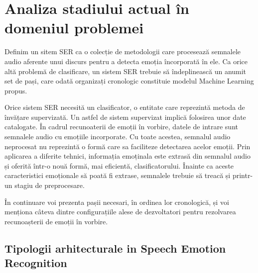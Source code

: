 \documentclass[a4paper,12pt]{book}
\begin{document}
	\chapter{Analiza stadiului actual în domeniul problemei} \label{introdP}
				Definim un sitem SER ca o colecție de metodologii care procesează semnalele audio aferente unui discurs pentru a detecta emoția încorporată în ele. Ca orice altă problemă de clasificare, un sistem SER trebuie să îndeplinească un anumit set de pași, care odată organizați cronologic constituie modelul Machine Learning propus. \par
				
				Orice sistem SER necesită un clasificator, o entitate care reprezintă metoda de învățare supervizată. Un astfel de sistem supervizat implică folosirea unor date catalogate. În cadrul recunoaterii de emoții în vorbire, datele de intrare sunt semnalele audio cu emoțiile incorporate. Cu toate acestea, semnalul audio neprocesat nu reprezintă o formă care sa faciliteze detectarea acelor emoții. Prin aplicarea a diferite tehnici, informația emoținala este extrasă din semnalul audio și oferită într-o nouă formă, mai eficientă,  clasificatorului. Înainte ca aceste caracteristici emoționale să poată fi extrase, semnalele trebuie să treacă și printr-un stagiu de preprocesare.\par
				
				În continuare voi prezenta pașii necesari, în ordinea lor cronologică, și voi menționa câteva dintre configurațiile alese de dezvoltatori pentru rezolvarea recunoașterii de emoții în vorbire.
				\section{Tipologii arhitecturale in Speech Emotion Recognition} 
\end{document}
